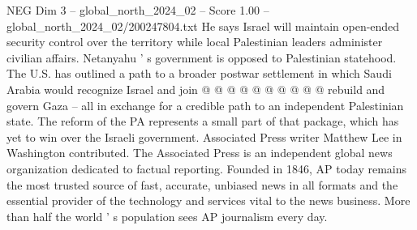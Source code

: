 \begin{textsample}{NEG Dim 3 – global\_north\_2024\_02 – Score 1.00 – global\_north\_2024\_02/200247804.txt}
He says Israel will maintain open-ended security control over the territory while local Palestinian leaders administer civilian affairs.
Netanyahu ' s government is opposed to Palestinian statehood.
The U.S. has outlined a path to a broader postwar settlement in which Saudi Arabia would recognize Israel and join @ @ @ @ @ @ @ @ @ @ rebuild and govern Gaza -- all in exchange for a credible path to an independent Palestinian state.
The reform of the PA represents a small part of that package, which has yet to win over the Israeli government.
Associated Press writer Matthew Lee in Washington contributed.
The Associated Press is an independent global news organization dedicated to factual reporting.
Founded in 1846, AP today remains the most trusted source of fast, accurate, unbiased news in all formats and the essential provider of the technology and services vital to the news business.
More than half the world ' s population sees AP journalism every day.

\end{textsample}
